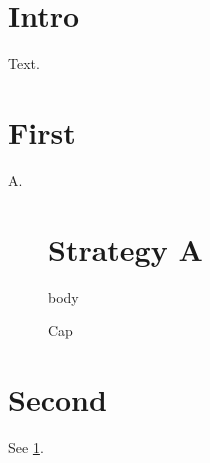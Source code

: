 \documentclass{article}
\begin{document}
\section{Intro} Text.
\appendix
\section{First} A.
\begin{figure}\section*{Strategy A} body \caption{Cap}\label{fig:x}\end{figure}
\section{Second} See \ref{fig:x}.
\end{document}
